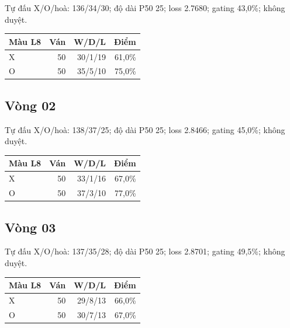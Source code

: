 Tự đấu X/O/hoà: 136/34/30; độ dài P50 25; loss 2.7680; gating 43,0\%; không duyệt.

\begin{center}\scriptsize\begin{tabular}{@{}lrrr@{}}\toprule

Màu L8 & Ván & W/D/L & Điểm \\

\midrule

X & 50 & 30/1/19 & 61,0\% \\

O & 50 & 35/5/10 & 75,0\% \\

\bottomrule\end{tabular}\end{center}

\subsection*{Vòng 02}

Tự đấu X/O/hoà: 138/37/25; độ dài P50 25; loss 2.8466; gating 45,0\%; không duyệt.

\begin{center}\scriptsize\begin{tabular}{@{}lrrr@{}}\toprule

Màu L8 & Ván & W/D/L & Điểm \\

\midrule

X & 50 & 33/1/16 & 67,0\% \\

O & 50 & 37/3/10 & 77,0\% \\

\bottomrule\end{tabular}\end{center}

\subsection*{Vòng 03}

Tự đấu X/O/hoà: 137/35/28; độ dài P50 25; loss 2.8701; gating 49,5\%; không duyệt.

\begin{center}\scriptsize\begin{tabular}{@{}lrrr@{}}\toprule

Màu L8 & Ván & W/D/L & Điểm \\

\midrule

X & 50 & 29/8/13 & 66,0\% \\

O & 50 & 30/7/13 & 67,0\% \\

\bottomrule\end{tabular}\end{center}


